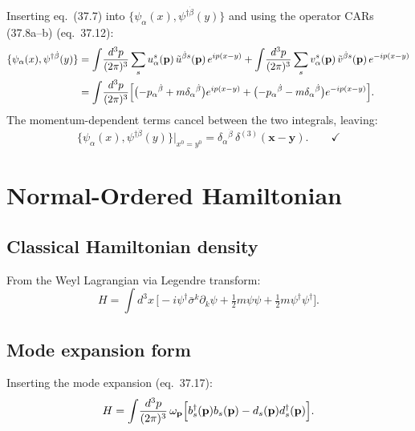 \documentclass[12pt]{article}
\newcommand{\omegap}{\omega_{\mathbf{p}}}
\begin{document}
Inserting eq.~(37.7) into $\{\psi_\alpha(x),\psi^{\dagger\dot\beta}(y)\}$ and
using the operator CARs (37.8a--b) (eq.~37.12):
\begin{align}
  \{\psi_\alpha(x),\psi^{\dagger\dot\beta}(y)\}
  &= \int\!\frac{d^3p}{(2\pi)^3}\sum_s u^s_\alpha(\mathbf{p})\,
     \tilde u^{\dot\beta s}(\mathbf{p})\,e^{ip(x-y)}
   + \int\!\frac{d^3p}{(2\pi)^3}\sum_s v^s_\alpha(\mathbf{p})\,
     \tilde v^{\dot\beta s}(\mathbf{p})\,e^{-ip(x-y)}
  \nonumber\\
  &= \int\!\frac{d^3p}{(2\pi)^3}\Bigl[
     \bigl(-p_\alpha{}^{\dot\beta}+m\delta_\alpha{}^{\dot\beta}\bigr)e^{ip(x-y)}
    +\bigl(-p_\alpha{}^{\dot\beta}-m\delta_\alpha{}^{\dot\beta}\bigr)e^{-ip(x-y)}
     \Bigr].
\end{align}
The momentum-dependent terms cancel between the two integrals, leaving:
\begin{equation}
  \{\psi_\alpha(x),\psi^{\dagger\dot\beta}(y)\}\Big|_{x^0=y^0}
  = \delta_\alpha{}^{\dot\beta}\,\delta^{(3)}(\mathbf{x}-\mathbf{y}).
  \qquad\checkmark
\end{equation}

\section{Normal-Ordered Hamiltonian}

\subsection{Classical Hamiltonian density}

From the Weyl Lagrangian via Legendre transform:
\begin{equation}
  H = \int\!d^3x\,\bigl[-i\psi^\dagger\bar\sigma^k\partial_k\psi
      + \tfrac{1}{2}m\psi\psi + \tfrac{1}{2}m\psi^\dagger\psi^\dagger\bigr].
\end{equation}

\subsection{Mode expansion form}

Inserting the mode expansion (eq.~37.17):
\begin{equation}
  H = \int\!\frac{d^3p}{(2\pi)^3}\,\omegap
  \Bigl[b^\dagger_s(\mathbf{p})b_s(\mathbf{p}) - d_s(\mathbf{p})d^\dagger_s(\mathbf{p})\Bigr].
\end{equation}
\end{document}
